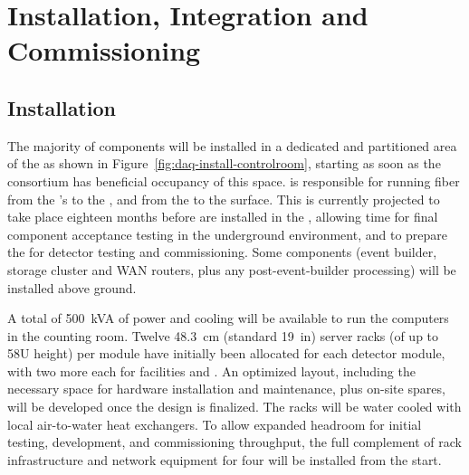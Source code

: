 
\section{Installation, Integration and Commissioning}
\label{sec:fdsp-daq-install}

\subsection{Installation}
\label{sec:fdsp-daq-install-transport}

The majority of  components will be installed in a dedicated and partitioned area of the  as shown in Figure~\ref{fig:daq-install-controlroom}, starting as soon as the consortium has beneficial occupancy of this space. %
 is responsible for running fiber from the 's  to the , and from the  to the surface. This is currently projected to take place eighteen months before  are installed in the , allowing time for final component acceptance testing in the underground environment, and to prepare the  for detector testing and commissioning. Some  components (event builder, storage cluster and WAN routers, plus any post-event-builder processing) will be installed above ground.

A total of \SI{500}{kVA} of power and cooling will be available to run the computers in the counting room. 
Twelve \SI{48.3}{cm} (standard \SI{19}{in}) server racks (of up to 58U height) per module have initially been allocated for each detector module, with two more each for facilities and . An optimized layout, including the necessary space for hardware installation and maintenance, plus on-site spares, will be developed once the  design is finalized. The racks will be water cooled with local air-to-water heat exchangers. To allow expanded headroom for initial testing, development, and commissioning throughput, the full complement of rack infrastructure and network equipment for four  will be installed from the start.  %

